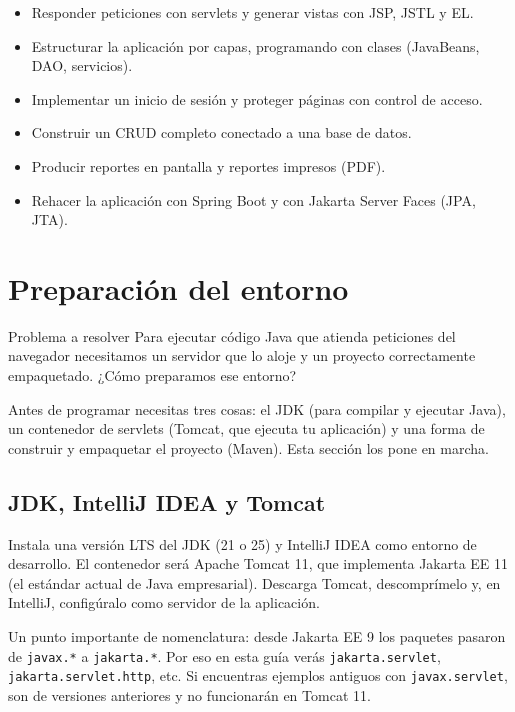 \documentclass[11pt]{article}
\begin{document}
\begin{itemize}[leftmargin=1.4em,itemsep=2pt,topsep=2pt]
\item Responder peticiones con servlets y generar vistas con JSP, JSTL y EL.
\item Estructurar la aplicación por capas, programando con clases (JavaBeans, DAO, servicios).
\item Implementar un inicio de sesión y proteger páginas con control de acceso.
\item Construir un CRUD completo conectado a una base de datos.
\item Producir reportes en pantalla y reportes impresos (PDF).
\item Rehacer la aplicación con Spring Boot y con Jakarta Server Faces (JPA, JTA).
\end{itemize}
\section{Preparación del entorno}
\begin{cajaproblema}{Problema a resolver}
Para ejecutar código Java que atienda peticiones del navegador necesitamos un servidor que lo aloje y un proyecto correctamente empaquetado. ¿Cómo preparamos ese entorno?\par
\end{cajaproblema}
Antes de programar necesitas tres cosas: el JDK (para compilar y ejecutar Java), un contenedor de servlets (Tomcat, que ejecuta tu aplicación) y una forma de construir y empaquetar el proyecto (Maven). Esta sección los pone en marcha.

\subsection{JDK, IntelliJ IDEA y Tomcat}
Instala una versión LTS del JDK (21 o 25) y IntelliJ IDEA como entorno de desarrollo. El contenedor será Apache Tomcat 11, que implementa Jakarta EE 11 (el estándar actual de Java empresarial). Descarga Tomcat, descomprímelo y, en IntelliJ, configúralo como servidor de la aplicación.

Un punto importante de nomenclatura: desde Jakarta EE 9 los paquetes pasaron de \texttt{javax.\allowbreak{}*} a \texttt{jakarta.\allowbreak{}*}. Por eso en esta guía verás \texttt{jakarta.\allowbreak{}servlet}, \texttt{jakarta.\allowbreak{}servlet.\allowbreak{}http}, etc. Si encuentras ejemplos antiguos con \texttt{javax.\allowbreak{}servlet}, son de versiones anteriores y no funcionarán en Tomcat 11.
\end{document}
